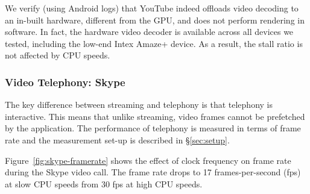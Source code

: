 We verify (using Android logs)  that YouTube indeed offloads video decoding to an in-built hardware, different from the GPU, and does not perform rendering in software. %
 In fact, the hardware video decoder is available across all devices we tested, including the low-end Intex Amaze+ device. As a result, the stall ratio is not affected by CPU speeds.



\subsubsection{Video Telephony: Skype}

The key difference between streaming and telephony is that telephony is interactive. This means that unlike streaming,  video frames cannot be prefetched by the application. The performance of telephony is measured in terms of frame rate %
and the measurement set-up is described in \S\ref{sec:setup}.

Figure~\ref{fig:skype-framerate} shows the effect of clock frequency on frame rate during the Skype video call. 
The frame rate drops to 17 frames-per-second (fps) at slow CPU speeds from 30 fps at high CPU speeds. 

